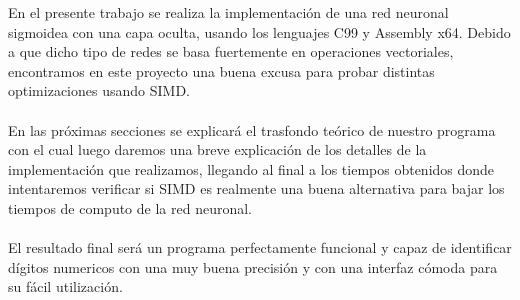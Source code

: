 
En el presente trabajo se realiza la implementación de una red neuronal sigmoidea con una capa oculta, usando los lenguajes C99 y Assembly x64. Debido a que dicho tipo de redes se basa fuertemente en operaciones vectoriales, encontramos en este proyecto una buena excusa para probar distintas optimizaciones usando SIMD.
\\
\\
En las próximas secciones se explicará el trasfondo teórico de nuestro programa con el cual luego daremos una breve explicación de los detalles de la implementación que realizamos, llegando al final a los tiempos obtenidos donde intentaremos verificar si SIMD es realmente una buena alternativa para bajar los tiempos de computo de la red neuronal.\\
\\
El resultado final será un programa perfectamente funcional y capaz de identificar dígitos numericos con una muy buena precisión y con una interfaz cómoda para su fácil utilización.
